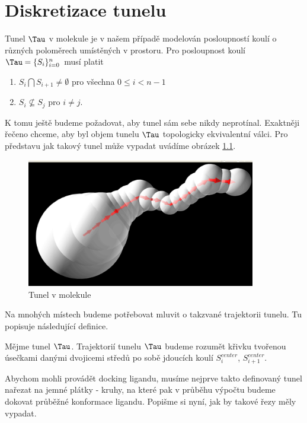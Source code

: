 \chapter{Diskretizace tunelu}
\setcounter{page}{1}

Tunel $ \Tau $ v molekule je v našem případě modelován posloupností koulí o různých
poloměrech umístěných v prostoru. Pro posloupnost koulí $ \Tau = \{S_i\}_{i=0}^{n} $
musí platit

    \begin{enumerate}[label={(\arabic*)}]
        \item $ S_i \bigcap S_{i+1} \neq \emptyset $ pro všechna $ 0 \leq i < n - 1$
        \item $ S_i \nsubseteq S_j$  pro $ i \neq j $.
    \end{enumerate}

K tomu ještě budeme požadovat, aby tunel sám sebe nikdy neprotínal. Exaktněji řečeno
chceme, aby byl objem tunelu $ \Tau $ topologicky ekvivalentní válci.
Pro představu jak takový tunel může vypadat uvádíme obrázek \ref{fig:basic_tunnel}.
\begin{figure}[ht]
  	\centering
	\includegraphics[width=100mm]{img/basic_tunnel.jpg}
	\caption{Tunel v molekule}
  \centering
  \label{fig:basic_tunnel}
\end{figure}

Na mnohých místech budeme potřebovat mluvit o takzvané trajektorii tunelu. Tu popisuje
následující definice.

\begin{defi}
Mějme tunel $ \Tau $. Trajektorií tunelu $ \Tau $ budeme rozumět křivku tvořenou
úsečkami danými dvojicemi středů po sobě jdoucích koulí $ S_i^{center} $,
$ S_{i+1}^{center} $.
\end{defi}

Abychom mohli provádět docking ligandu, musíme nejprve takto definovaný tunel nařezat na
jemné plátky - kruhy, na které pak v průběhu výpočtu budeme dokovat průběžné konformace ligandu.
Popišme si nyní, jak by takové řezy měly vypadat.


